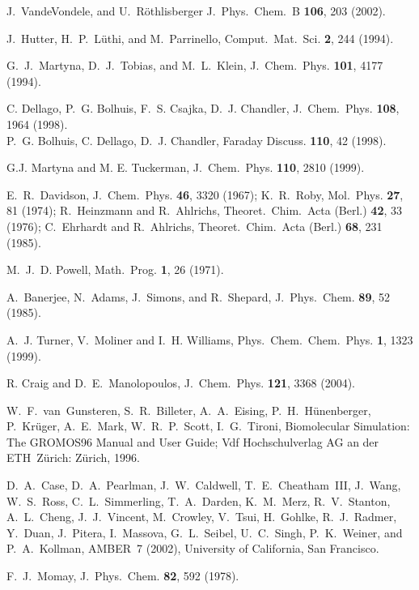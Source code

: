 \documentclass[twoside,10pt,titlepage,a4paper]{article}
\begin{document}
\begin{thebibliography}{999}
    J.~VandeVondele, and U.~R\"othlisberger
    J.~Phys.~Chem.~B {\bf 106}, 203 (2002).

    J.~Hutter, H.~P.~L\"uthi, and M.~Parrinello,
    Comput.~Mat.~Sci. {\bf 2}, 244 (1994).

    G.~J.~Martyna, D.~J.~Tobias, and M.~L.~Klein,
    J.~Chem.~Phys. {\bf 101}, 4177 (1994).

     C. Dellago, P.~G. Bolhuis, F.~S. Csajka, D.~J. Chandler, J.~Chem.~Phys. {\bf 108}, 1964 (1998). \\
     P.~G. Bolhuis, C. Dellago, D.~J. Chandler, Faraday Discuss. {\bf 110}, 42 (1998).

 G.J. Martyna and M. E. Tuckerman,
    J.~Chem.~Phys. {\bf 110}, 2810 (1999).

    E.~R.~Davidson, J.~Chem.~Phys. {\bf 46}, 3320 (1967);
    K.~R.~Roby, Mol.~Phys. {\bf 27}, 81 (1974);
    R.~Heinzmann and R.~Ahlrichs, Theoret.~Chim.~Acta (Berl.)
    {\bf 42}, 33 (1976);
    C.~Ehrhardt and R.~Ahlrichs, Theoret.~Chim.~Acta (Berl.)
    {\bf 68}, 231 (1985).

    M.~J.~D. Powell, Math.~Prog. {\bf 1}, 26 (1971).

    A.~Banerjee, N.~Adams, J.~Simons, and R.~Shepard,
    J.~Phys.~Chem. {\bf 89}, 52 (1985).

    A.~J. Turner, V.~Moliner and I.~H. Williams,
    Phys.~Chem.~Chem.~Phys. {\bf 1}, 1323 (1999).

    R. Craig and D.~E.~Manolopoulos, 
    J.~Chem.~Phys. {\bf 121}, 3368 (2004).

    W.~F.~van~Gunsteren, S.~R.~Billeter, A.~A.~Eising, P.~H.~H\"unenberger,
    P.~Kr\"uger, A.~E.~Mark, W.~R.~P.~Scott, I.~G.~Tironi,
    Biomolecular Simulation: The GROMOS96 Manual and User Guide;
    Vdf Hochschulverlag AG an der ETH~Z\"urich: Z\"urich, 1996.

    D.~A.~Case, D.~A.~Pearlman, J.~W.~Caldwell, T.~E.~Cheatham~III, J.~Wang,
    W.~S.~Ross, C.~L.~Simmerling, T.~A.~Darden, K.~M.~Merz, R.~V.~Stanton,
    A.~L.~Cheng, J.~J.~Vincent, M.~Crowley, V.~Tsui, H.~Gohlke, R.~J.~Radmer,
    Y.~Duan, J.~Pitera, I.~Massova, G.~L.~Seibel, U.~C.~Singh, P.~K.~Weiner,
    and P.~A.~Kollman, AMBER~7 (2002), University of California, San Francisco.

    F.~J.~Momay,
    J.~Phys.~Chem. {\bf 82}, 592 (1978).


\end{thebibliography}
\end{document}
